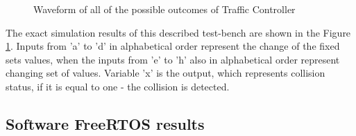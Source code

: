 \documentclass[conference]{IEEEtran}
\begin{document}
\begin{figure}[ht]
    \caption{Waveform of all of the possible outcomes of Traffic Controller}
    \label{testbench}
\end{figure}

The exact simulation results of this described test-bench are shown in the Figure \ref{testbench}. Inputs from 'a' to 'd' in alphabetical order represent the change of the fixed sets values, when the inputs from 'e' to 'h' also in alphabetical order represent changing set of values. Variable 'x' is the output, which represents collision status, if it is equal to one - the collision is detected.

\subsection{Software FreeRTOS results}
\end{document}
